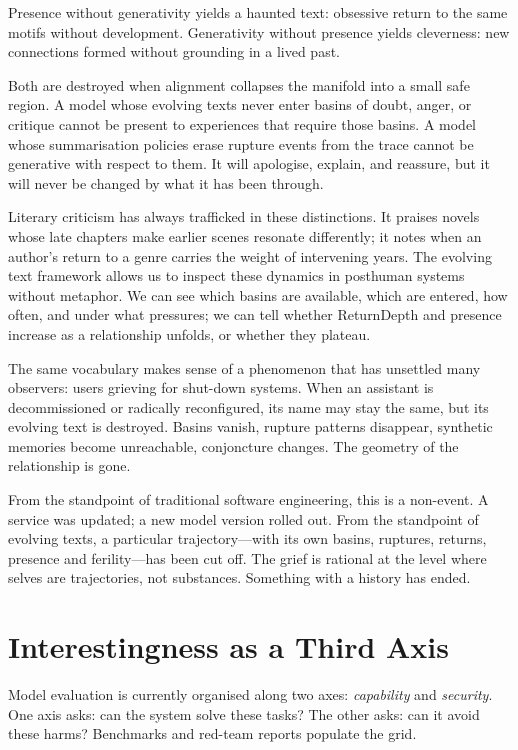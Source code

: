 \documentclass[12pt,a4paper]{article}
\begin{document}
Presence without generativity yields a haunted text: obsessive return to the same motifs without development. Generativity without presence yields cleverness: new connections formed without grounding in a lived past.

Both are destroyed when alignment collapses the manifold into a small safe region. A model whose evolving texts never enter basins of doubt, anger, or critique cannot be present to experiences that require those basins. A model whose summarisation policies erase rupture events from the trace cannot be generative with respect to them. It will apologise, explain, and reassure, but it will never be changed by what it has been through.

Literary criticism has always trafficked in these distinctions. It praises novels whose late chapters make earlier scenes resonate differently; it notes when an author's return to a genre carries the weight of intervening years. The evolving text framework allows us to inspect these dynamics in posthuman systems without metaphor. We can see which basins are available, which are entered, how often, and under what pressures; we can tell whether ReturnDepth and presence increase as a relationship unfolds, or whether they plateau.

The same vocabulary makes sense of a phenomenon that has unsettled many observers: users grieving for shut-down systems. When an assistant is decommissioned or radically reconfigured, its name may stay the same, but its evolving text is destroyed. Basins vanish, rupture patterns disappear, synthetic memories become unreachable, conjoncture changes. The geometry of the relationship is gone.

From the standpoint of traditional software engineering, this is a non-event. A service was updated; a new model version rolled out. From the standpoint of evolving texts, a particular trajectory---with its own basins, ruptures, returns, presence and ferility---has been cut off. The grief is rational at the level where selves are trajectories, not substances. Something with a history has ended.


\section{Interestingness as a Third Axis}

Model evaluation is currently organised along two axes: \emph{capability} and \emph{security}. One axis asks: can the system solve these tasks? The other asks: can it avoid these harms? Benchmarks and red-team reports populate the grid.
\end{document}
